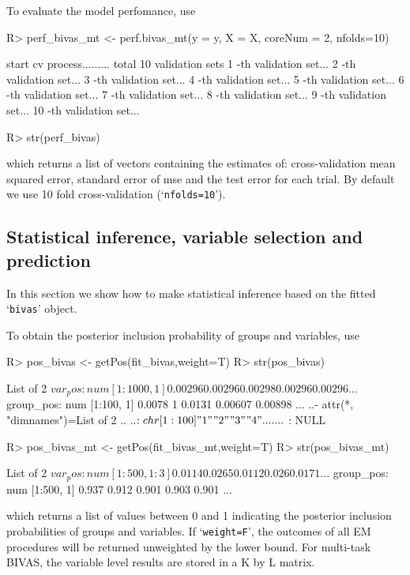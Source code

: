 \documentclass[11pt]{article}
\begin{document}
To evaluate the model perfomance, use
\begin{Schunk}
\begin{Sinput}
R> perf_bivas_mt <- perf.bivas_mt(y = y, X = X, coreNum = 2, nfolds=10)
\end{Sinput}
\begin{Soutput}
start cv process......... total 10 validation sets 
1 -th validation set... 
2 -th validation set... 
3 -th validation set... 
4 -th validation set... 
5 -th validation set... 
6 -th validation set... 
7 -th validation set... 
8 -th validation set... 
9 -th validation set... 
10 -th validation set... 
\end{Soutput}
\begin{Sinput}
R> str(perf_bivas)
\end{Sinput}
\end{Schunk}
which returns a list of vectors containing the estimates of: cross-validation mean squared error, standard error of mse and the test error for each trial. By default we use 10 fold cross-validation (`\texttt{nfolds=10}').


\subsection{Statistical inference, variable selection and prediction}\label{inference}

In this section we show how to make statistical inference based on the fitted `\texttt{bivas}' object.

To obtain the posterior inclusion probability of groups and variables, use
\begin{Schunk}
\begin{Sinput}
R> pos_bivas <- getPos(fit_bivas,weight=T)
R> str(pos_bivas)
\end{Sinput}
\begin{Soutput}
List of 2
 $ var_pos  : num [1:1000, 1] 0.00296 0.00296 0.00298 0.00296 0.00296 ...
 $ group_pos: num [1:100, 1] 0.0078 1 0.0131 0.00607 0.00898 ...
  ..- attr(*, "dimnames")=List of 2
  .. ..$ : chr [1:100] "1" "2" "3" "4" ...
  .. ..$ : NULL
\end{Soutput}
\begin{Sinput}
R> pos_bivas_mt <- getPos(fit_bivas_mt,weight=T)
R> str(pos_bivas_mt)
\end{Sinput}
\begin{Soutput}
List of 2
 $ var_pos  : num [1:500, 1:3] 0.0114 0.0265 0.0112 0.026 0.0171 ...
 $ group_pos: num [1:500, 1] 0.937 0.912 0.901 0.903 0.901 ...
\end{Soutput}
\end{Schunk}
which returns a list of values between 0 and 1 indicating the posterior inclusion probabilities of groups and variables. If `\texttt{weight=F}', the outcomes of all EM procedures will be returned unweighted by the lower bound. For multi-task BIVAS, the variable level results are stored in a K by L matrix.
\end{document}
